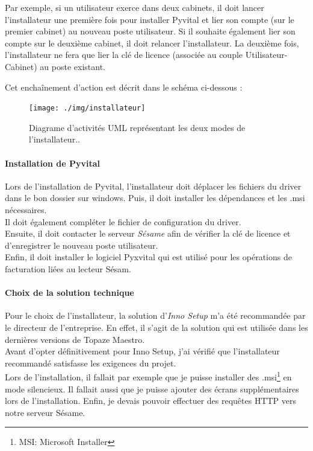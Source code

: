 Par exemple, si un utilisateur exerce dans deux cabinets, il doit lancer l'installateur une première fois pour installer Pyvital et lier son compte (sur le premier cabinet) au nouveau poste utilisateur.
Si il souhaite également lier son compte sur le deuxième cabinet, il doit relancer l'installateur. La deuxième fois, l'installateur ne fera que lier la clé de licence (associée au couple Utilisateur-Cabinet) au poste existant.

Cet enchaînement d'action est décrit dans le schéma ci-dessous : 
\begin{figure}[H]
  \centering
  \texttt{[image: ./img/installateur]}
  \caption{\label{fig:installateur} Diagrame d'activités UML représentant les deux modes de l'installateur..}
\end{figure}

\paragraph*{Installation de Pyvital}
Lors de l'installation de Pyvital, l'installateur doit déplacer les fichiers du driver dans le bon dossier sur windows. Puis, il doit installer les dépendances et les .msi nécessaires.\\ 
Il doit également compléter le fichier de configuration du driver. \\
Ensuite, il doit contacter le serveur \textit{Sésame} afin de vérifier la clé de licence et d'enregistrer le nouveau poste utilisateur. \\
Enfin, il doit installer le logiciel Pyxvital qui est utilisé pour les opérations de facturation liées au lecteur Sésam.

\paragraph*{Choix de la solution technique\\}
Pour le choix de l'installateur, la solution d'\textit{Inno Setup} m'a été recommandée par le directeur de l'entreprise. En effet, il s'agit de la solution qui est utilisée dans les dernières versions de Topaze Maestro.\\
Avant d'opter définitivement pour Inno Setup, j'ai vérifié que l'installateur recommandé satisfasse les exigences du projet.\\ Lors de l'installation, il fallait par exemple que je puisse installer des .msi\footnote{MSI: Microsoft Installer} en mode silencieux. Il fallait aussi que je puisse ajouter des écrans supplémentaires lors de l'installation. Enfin, je devais pouvoir effectuer des requêtes HTTP vers notre serveur Sésame.

